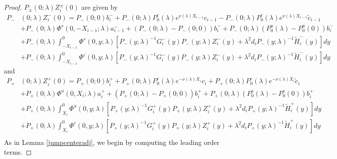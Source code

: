 \documentclass[thesis.tex]{subfiles}
\begin{document}
\begin{lemma}
\begin{proof}
$P_\pm(0; \lambda) Z_i^\pm(0)$ are given by
\begin{align*}
P_-&(0; \lambda) Z_i^-(0) = P_-(0; 0) b_i^- + P_-(0; \lambda)P_0^c(\lambda) e^{\nu(\lambda) X_{i-1}} c_{i-1} - P_-(0; \lambda)P_0^c(\lambda) e^{\nu(\lambda) X_{i-1}} \tilde{c}_{i-1} \\
&+ P_-(0; \lambda) \Phi^s(0, -X_{i-1}; \lambda) a_{i-1}^- + (P_-(0; \lambda) - P_-(0; 0))b_i^- + P_-(0; \lambda)(P_0^u(\lambda) - P_0^u(0))b_i^- \\
&+ P_-(0; \lambda) \int_{-X_{i-1}}^0 \Phi^s(0, y; \lambda) [P_-(y; \lambda)^{-1} G_i^-(y) P_-(y; \lambda)Z_i^-(y) + \lambda^2 d_i P_-(y; \lambda)^{-1} \tilde{H}_i^-(y)] dy \\
&+ P_-(0; \lambda) \int_{-X_{i-1}}^0 \Phi^c(0, y; \lambda) [P_-(y; \lambda)^{-1} G_i^-(y) P_-(y; \lambda)Z_i^-(y) + \lambda^2 d_i P_-(y; \lambda)^{-1} \tilde{H}_i^-(y)] dy
\end{align*}
and
\begin{align*}
P_+&(0; \lambda) Z_i^+(0) = P_+(0; 0) b_i^+ + P_+(0; \lambda) P_0^c(\lambda) e^{-\nu(\lambda)X_i} c_i + P_+(0; \lambda) P_0^c(\lambda) e^{-\nu(\lambda)X_i} \tilde{c}_i \\
&+ P_+(0; \lambda) \Phi^u(0, X_i; \lambda) a_i^+ + (P_+(0; \lambda) - P_+(0; 0)) b_i^+ + P_+(0; \lambda) (P_0^s(\lambda) - P_0^s(0)) b_i^+ \\
&+ P_+(0; \lambda) \int_{X_i}^0 \Phi^u(0, y; \lambda) [P_+(y; \lambda)^{-1} G_i^+(y) P_+(y; \lambda) Z_i^+(y) + \lambda^2 d_i P_+(y; \lambda)^{-1} \tilde{H}_i^+(y)] dy \\
&+ P_+(0; \lambda) \int_{X_i}^0 \Phi^c(0, y; \lambda) [P_+(y; \lambda)^{-1} G_i^+(y) P_+(y; \lambda) Z_i^+(y) + \lambda^2 d_i P_+(y; \lambda)^{-1} \tilde{H}_i^+(y)] dy \\
\end{align*}
As in Lemma \ref{jumpcenteradj}, we begin by computing the leading order terms.


\end{proof}
\end{lemma}
\end{document}
